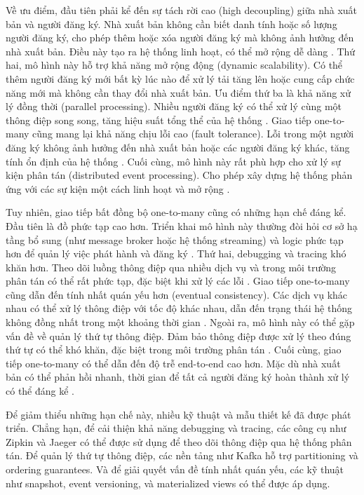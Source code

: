 Về ưu điểm, đầu tiên phải kể đến sự tách rời cao (high decoupling) giữa nhà xuất bản và người đăng ký. Nhà xuất bản không cần biết danh tính hoặc số lượng người đăng ký, cho phép thêm hoặc xóa người đăng ký mà không ảnh hưởng đến nhà xuất bản. Điều này tạo ra hệ thống linh hoạt, có thể mở rộng dễ dàng \cite{newman2015}. Thứ hai, mô hình này hỗ trợ khả năng mở rộng động (dynamic scalability). Có thể thêm người đăng ký mới bất kỳ lúc nào để xử lý tải tăng lên hoặc cung cấp chức năng mới mà không cần thay đổi nhà xuất bản. Ưu điểm thứ ba là khả năng xử lý đồng thời (parallel processing). Nhiều người đăng ký có thể xử lý cùng một thông điệp song song, tăng hiệu suất tổng thể của hệ thống \cite{wolff2016}. Giao tiếp one-to-many cũng mang lại khả năng chịu lỗi cao (fault tolerance). Lỗi trong một người đăng ký không ảnh hưởng đến nhà xuất bản hoặc các người đăng ký khác, tăng tính ổn định của hệ thống \cite{richardson2019}. Cuối cùng, mô hình này rất phù hợp cho xử lý sự kiện phân tán (distributed event processing). Cho phép xây dựng hệ thống phản ứng với các sự kiện một cách linh hoạt và mở rộng \cite{hohpe2004}.

Tuy nhiên, giao tiếp bất đồng bộ one-to-many cũng có những hạn chế đáng kể. Đầu tiên là đồ phức tạp cao hơn. Triển khai mô hình này thường đòi hỏi cơ sở hạ tầng bổ sung (như message broker hoặc hệ thống streaming) và logic phức tạp hơn để quản lý việc phát hành và đăng ký \cite{newman2015}. Thứ hai, debugging và tracing khó khăn hơn. Theo dõi luồng thông điệp qua nhiều dịch vụ và trong môi trường phân tán có thể rất phức tạp, đặc biệt khi xử lý các lỗi \cite{wolff2016}. Giao tiếp one-to-many cũng dẫn đến tính nhất quán yếu hơn (eventual consistency). Các dịch vụ khác nhau có thể xử lý thông điệp với tốc độ khác nhau, dẫn đến trạng thái hệ thống không đồng nhất trong một khoảng thời gian \cite{richardson2019}. Ngoài ra, mô hình này có thể gặp vấn đề về quản lý thứ tự thông điệp. Đảm bảo thông điệp được xử lý theo đúng thứ tự có thể khó khăn, đặc biệt trong môi trường phân tán \cite{aksakalli2021}. Cuối cùng, giao tiếp one-to-many có thể dẫn đến độ trễ end-to-end cao hơn. Mặc dù nhà xuất bản có thể phản hồi nhanh, thời gian để tất cả người đăng ký hoàn thành xử lý có thể đáng kể \cite{jun2018}.

Để giảm thiểu những hạn chế này, nhiều kỹ thuật và mẫu thiết kế đã được phát triển. Chẳng hạn, để cải thiện khả năng debugging và tracing, các công cụ như Zipkin và Jaeger có thể được sử dụng để theo dõi thông điệp qua hệ thống phân tán. Để quản lý thứ tự thông điệp, các nền tảng như Kafka hỗ trợ partitioning và ordering guarantees. Và để giải quyết vấn đề tính nhất quán yếu, các kỹ thuật như snapshot, event versioning, và materialized views có thể được áp dụng.

